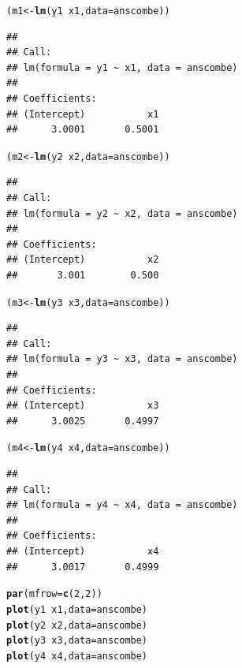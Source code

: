 \documentclass{article}\usepackage[]{graphicx}\usepackage[]{color}
\makeatletter
\newcommand{\hlnum}[1]{\textcolor[rgb]{0.686,0.059,0.569}{#1}}%
\newcommand{\hlopt}[1]{\textcolor[rgb]{0,0,0}{#1}}%
\newcommand{\hlstd}[1]{\textcolor[rgb]{0.345,0.345,0.345}{#1}}%
\newcommand{\hlkwb}[1]{\textcolor[rgb]{0.69,0.353,0.396}{#1}}%
\newcommand{\hlkwc}[1]{\textcolor[rgb]{0.333,0.667,0.333}{#1}}%
\newcommand{\hlkwd}[1]{\textcolor[rgb]{0.737,0.353,0.396}{\textbf{#1}}}%
\newenvironment{kframe}{%
 \def\at@end@of@kframe{}%
 \ifinner\ifhmode%
  \def\at@end@of@kframe{\end{minipage}}%
  \begin{minipage}{\columnwidth}%
 \fi\fi%
 \def\FrameCommand##1{\hskip\@totalleftmargin \hskip-\fboxsep
 \colorbox{shadecolor}{##1}\hskip-\fboxsep
     \hskip-\linewidth \hskip-\@totalleftmargin \hskip\columnwidth}%
 \MakeFramed {\advance\hsize-\width
   \@totalleftmargin\z@ \linewidth\hsize
   \@setminipage}}%
 {\par\unskip\endMakeFramed%
 \at@end@of@kframe}
\newenvironment{knitrout}{}{} %
\makeatother
\begin{document}
\begin{knitrout}
\color{fgcolor}\begin{kframe}
\begin{alltt}
\hlstd{(m1} \hlkwb{<-} \hlkwd{lm}\hlstd{(y1} \hlopt{~} \hlstd{x1,} \hlkwc{data} \hlstd{= anscombe))}
\end{alltt}
\begin{verbatim}
## 
## Call:
## lm(formula = y1 ~ x1, data = anscombe)
## 
## Coefficients:
## (Intercept)           x1  
##      3.0001       0.5001
\end{verbatim}
\begin{alltt}
\hlstd{(m2} \hlkwb{<-} \hlkwd{lm}\hlstd{(y2} \hlopt{~} \hlstd{x2,} \hlkwc{data} \hlstd{= anscombe))}
\end{alltt}
\begin{verbatim}
## 
## Call:
## lm(formula = y2 ~ x2, data = anscombe)
## 
## Coefficients:
## (Intercept)           x2  
##       3.001        0.500
\end{verbatim}
\begin{alltt}
\hlstd{(m3} \hlkwb{<-} \hlkwd{lm}\hlstd{(y3} \hlopt{~} \hlstd{x3,} \hlkwc{data} \hlstd{= anscombe))}
\end{alltt}
\begin{verbatim}
## 
## Call:
## lm(formula = y3 ~ x3, data = anscombe)
## 
## Coefficients:
## (Intercept)           x3  
##      3.0025       0.4997
\end{verbatim}
\begin{alltt}
\hlstd{(m4} \hlkwb{<-} \hlkwd{lm}\hlstd{(y4} \hlopt{~} \hlstd{x4,} \hlkwc{data} \hlstd{= anscombe))}
\end{alltt}
\begin{verbatim}
## 
## Call:
## lm(formula = y4 ~ x4, data = anscombe)
## 
## Coefficients:
## (Intercept)           x4  
##      3.0017       0.4999
\end{verbatim}
\begin{alltt}
\hlkwd{par}\hlstd{(}\hlkwc{mfrow}\hlstd{=}\hlkwd{c}\hlstd{(}\hlnum{2}\hlstd{,}\hlnum{2}\hlstd{))}
\hlkwd{plot}\hlstd{(y1} \hlopt{~} \hlstd{x1,} \hlkwc{data} \hlstd{= anscombe)}
\hlkwd{plot}\hlstd{(y2} \hlopt{~} \hlstd{x2,} \hlkwc{data} \hlstd{= anscombe)}
\hlkwd{plot}\hlstd{(y3} \hlopt{~} \hlstd{x3,} \hlkwc{data} \hlstd{= anscombe)}
\hlkwd{plot}\hlstd{(y4} \hlopt{~} \hlstd{x4,} \hlkwc{data} \hlstd{= anscombe)}
\end{alltt}
\end{kframe}

\end{knitrout}
\end{document}
